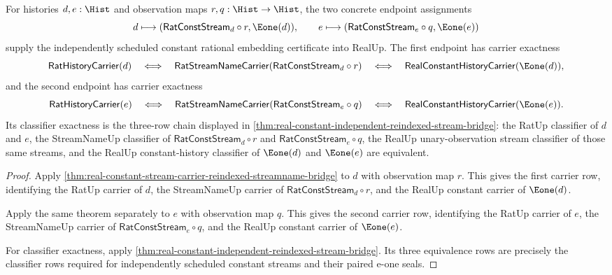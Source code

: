 \begin{theorem}
\label{thm:real-independent-reindexed-constant-rational-embedding-certificate}
For histories $d,e:\Hist$ and observation maps $r,q:\Hist\to\Hist$, the two
concrete endpoint assignments
$$
d\longmapsto (\mathsf{RatConstStream}_d\circ r,\Eone(d)),
\qquad
e\longmapsto (\mathsf{RatConstStream}_e\circ q,\Eone(e))
$$
supply the independently scheduled constant rational embedding certificate into
RealUp. The first endpoint has carrier exactness
$$
\mathsf{RatHistoryCarrier}(d)
\quad\Longleftrightarrow\quad
\mathsf{RatStreamNameCarrier}(\mathsf{RatConstStream}_d\circ r)
\quad\Longleftrightarrow\quad
\mathsf{RealConstantHistoryCarrier}(\Eone(d)),
$$
and the second endpoint has carrier exactness
$$
\mathsf{RatHistoryCarrier}(e)
\quad\Longleftrightarrow\quad
\mathsf{RatStreamNameCarrier}(\mathsf{RatConstStream}_e\circ q)
\quad\Longleftrightarrow\quad
\mathsf{RealConstantHistoryCarrier}(\Eone(e)).
$$
Its classifier exactness is the three-row chain displayed in
\autoref{thm:real-constant-independent-reindexed-stream-bridge}: the RatUp
classifier of $d$ and $e$, the StreamNameUp classifier of
$\mathsf{RatConstStream}_d\circ r$ and $\mathsf{RatConstStream}_e\circ q$, the
RealUp unary-observation stream classifier of those same streams, and the
RealUp constant-history classifier of $\Eone(d)$ and $\Eone(e)$ are equivalent.
\end{theorem}
\begin{proof}
Apply \autoref{thm:real-constant-stream-carrier-reindexed-streamname-bridge}
to $d$ with observation map $r$. This gives the first carrier row, identifying
the RatUp carrier of $d$, the StreamNameUp carrier of
$\mathsf{RatConstStream}_d\circ r$, and the RealUp constant carrier of
$\Eone(d)$.

Apply the same theorem separately to $e$ with observation map $q$. This gives
the second carrier row, identifying the RatUp carrier of $e$, the StreamNameUp
carrier of $\mathsf{RatConstStream}_e\circ q$, and the RealUp constant carrier
of $\Eone(e)$.

For classifier exactness, apply
\autoref{thm:real-constant-independent-reindexed-stream-bridge}. Its three
equivalence rows are precisely the classifier rows required for independently
scheduled constant streams and their paired e-one seals.
\end{proof}


